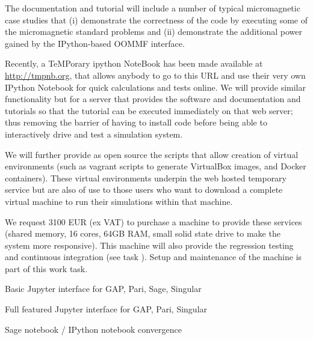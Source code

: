 \begin{workpackage}
\begin{tasklist}
\begin{task}[title=OOMMF case study: \OOMMFNB{} tutorial and
  documentation, id=oommf-tutorial-and-documentation]
  The documentation and tutorial will include a number of typical
  micromagnetic case studies that (i) demonstrate the correctness of
  the code by executing some of the micromagnetic standard problems
  and (ii) demonstrate the additional power gained by the
  IPython-based OOMMF interface.
\end{task}

\begin{task}[id=oommf-nb-ve,title=OOMMF case study: \OOMMFNB{} virtual environments]
  Recently, a TeMPorary ipython NoteBook has been made available at
  \href{http://tmpnb.org}{http://tmpnb.org}, that allows anybody to go
  to this URL and use their very own IPython Notebook for quick
  calculations and tests online. We will provide similar functionality
  but for a server that provides the \OOMMFNB{} software and \OOMMFNB{}
  documentation and tutorials so that the tutorial can be executed
  immediately on that web server; thus removing the barrier of having
  to install code before being able to interactively drive and test a
  simulation system.

  We will further provide as open source the scripts that allow
  creation of virtual environments (such as vagrant scripts to
  generate VirtualBox images, and Docker containers). These virtual
  environments underpin the web hosted temporary \OOMMFNB{}
  service but are also of use to those users who want to download a
  complete virtual machine to run their simulations within that
  machine.

  We request 3100 EUR (ex VAT) to purchase a machine to provide these
  services (shared memory, 16 cores, 64GB RAM, small solid state drive
  to make the system more responsive). This machine will also provide
  the regression testing and continuous integration (see task
  ). Setup and
  maintenance of the machine is part of this work task.
\end{task}

\end{tasklist}

\begin{wpdelivs}
  \begin{wpdeliv}[due=12,id=ipython-kernels-basic,dissem=PU,nature=O]
      {Basic Jupyter interface for GAP, Pari, Sage, Singular}
\end{wpdeliv}
  \begin{wpdeliv}[due=12,id=ipython-kernels,dissem=PU,nature=O]
      {Full featured Jupyter interface for GAP, Pari, Singular}
\end{wpdeliv}
  \begin{wpdeliv}[due=12,id=ipython-kernel-sage,dissem=PU,nature=DEM]
      {Sage notebook / IPython notebook convergence}
\end{wpdeliv}


\end{wpdelivs}
\end{workpackage}
